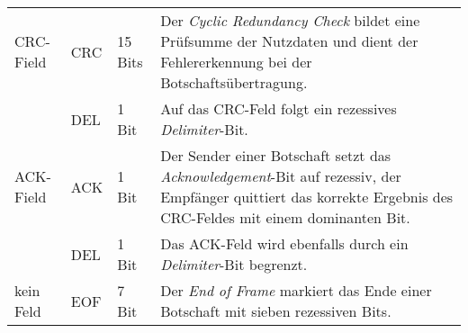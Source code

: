 \begin{table}[!htb]
\begin{tabular}{l | l l p{7.5cm}}
		\midrule
		CRC-Field         & CRC        & 15 Bits     & Der \emph{Cyclic Redundancy Check} bildet eine Prüfsumme der Nutzdaten und dient der Fehlererkennung bei der Botschaftsübertragung.                                                                               \\
		                  & DEL        & 1 Bit       & Auf das CRC-Feld folgt ein rezessives \emph{Delimiter}-Bit.                                      \\
		\midrule
		ACK-Field         & ACK        & 1 Bit       & Der Sender einer Botschaft setzt das \emph{Acknowledgement}-Bit auf rezessiv, der Empfänger quittiert das korrekte Ergebnis des CRC-Feldes mit einem dominanten Bit.                                              \\
		                  & DEL        & 1 Bit       & Das ACK-Feld wird ebenfalls durch ein \emph{Delimiter}-Bit begrenzt.                                                                                                                                              \\
		\midrule
		kein Feld         & EOF        & 7 Bit       & Der \emph{End of Frame} markiert das Ende einer Botschaft mit sieben rezessiven Bits.                                                                                                                             \\ \bottomrule
	\end{tabular}
	
	\label{tab:CAN-Data-Frame}
\end{table}

